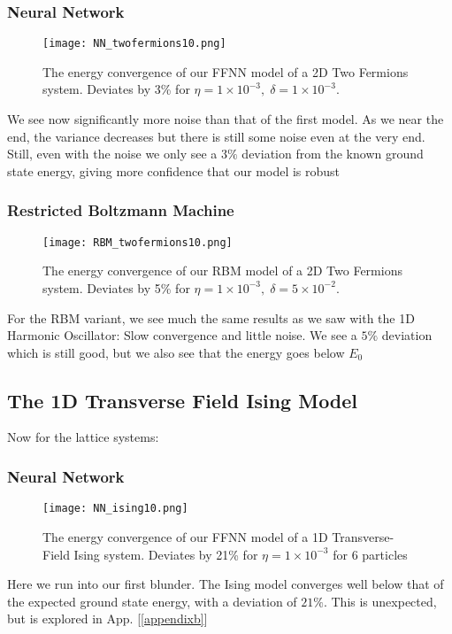 \documentclass[12pt]{article}
\begin{document}
{\subsubsection*{Neural Network}
\begin{figure}[ht!]
    \centering
    \texttt{[image: NN\_twofermions10.png]}
    \caption{The energy convergence of our FFNN model of a 2D Two Fermions system. Deviates by 3\% for $\eta = 1 \times 10^{-3}, \; \delta = 1 \times 10^{-3}$.}
    \label{fig:NNtf}
\end{figure}
We see now significantly more noise than that of the first model. As we near the end, the variance decreases but there is still some noise even at the very end. Still, even with the noise we only see a $3\%$ deviation from the known ground state energy, giving more confidence that our model is robust
\newpage
\subsubsection*{Restricted Boltzmann Machine}
\begin{figure}[ht!]
    \centering
    \texttt{[image: RBM\_twofermions10.png]}
    \caption{The energy convergence of our RBM model of a 2D Two Fermions system. Deviates by 5\% for $\eta = 1 \times 10^{-3}, \; \delta = 5 \times 10^{-2}$.}
    \label{fig:RBMtf}
\end{figure}
For the RBM variant, we see much the same results as we saw with the 1D Harmonic Oscillator: Slow convergence and little noise. We see a $5\%$ deviation which is still good, but we also see that the energy goes below $E_0$
\newpage
\subsection{The 1D Transverse Field Ising Model}
Now for the lattice systems:
\subsubsection*{Neural Network}
\begin{figure}[ht!]
    \centering
    \texttt{[image: NN\_ising10.png]}
    \caption{The energy convergence of our FFNN model of a 1D Transverse-Field Ising system. Deviates by 21\% for $\eta = 1 \times 10^{-3}$ for 6 particles}
    \label{fig:NNtfi}
\end{figure}
Here we run into our first blunder. The Ising model converges well below that of the expected ground state energy, with a deviation of $21\%$. This is unexpected, but is explored in App. [\ref{appendixb}]
\newpage
}
\end{document}
